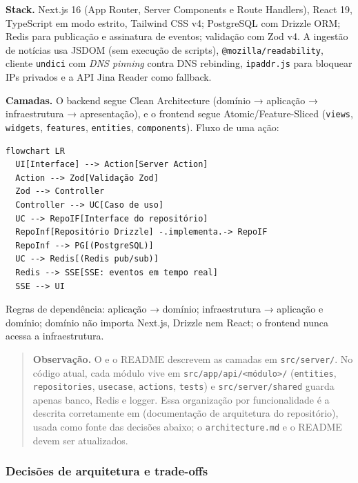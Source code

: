 \documentclass[
  brazilian,
  11pt,
]{article}
\begin{document}
\textbf{Stack.} Next.js 16 (App Router, Server Components e Route Handlers), React 19, TypeScript em modo estrito, Tailwind CSS v4; PostgreSQL com Drizzle ORM; Redis para publicação e assinatura de eventos; validação com Zod v4. A ingestão de notícias usa JSDOM (sem execução de scripts), \texttt{@mozilla/readability}, cliente \texttt{undici} com \emph{DNS pinning} contra DNS rebinding, \texttt{ipaddr.js} para bloquear IPs privados e a API Jina Reader como fallback.

\textbf{Camadas.} O backend segue Clean Architecture (domínio → aplicação → infraestrutura → apresentação), e o frontend segue Atomic/Feature-Sliced (\texttt{views}, \texttt{widgets}, \texttt{features}, \texttt{entities}, \texttt{components}). Fluxo de uma ação:

\begin{verbatim}
flowchart LR
  UI[Interface] --> Action[Server Action]
  Action --> Zod[Validação Zod]
  Zod --> Controller
  Controller --> UC[Caso de uso]
  UC --> RepoIF[Interface do repositório]
  RepoInf[Repositório Drizzle] -.implementa.-> RepoIF
  RepoInf --> PG[(PostgreSQL)]
  UC --> Redis[(Redis pub/sub)]
  Redis --> SSE[SSE: eventos em tempo real]
  SSE --> UI
\end{verbatim}

Regras de dependência: aplicação → domínio; infraestrutura → aplicação e domínio; domínio não importa Next.js, Drizzle nem React; o frontend nunca acessa a infraestrutura.

\begin{quote}
\textbf{Observação.} O  e o README descrevem as camadas em \texttt{src/server/}. No código atual, cada módulo vive em \texttt{src/app/api/\textless{}módulo\textgreater{}/} (\texttt{entities}, \texttt{repositories}, \texttt{usecase}, \texttt{actions}, \texttt{tests}) e \texttt{src/server/shared} guarda apenas banco, Redis e logger. Essa organização por funcionalidade é a descrita corretamente em  (documentação de arquitetura do repositório), usada como fonte das decisões abaixo; o \texttt{architecture.md} e o README devem ser atualizados.
\end{quote}

\subsubsection{Decisões de arquitetura e trade-offs}\label{decisuxf5es-de-arquitetura-e-trade-offs}
\end{document}
